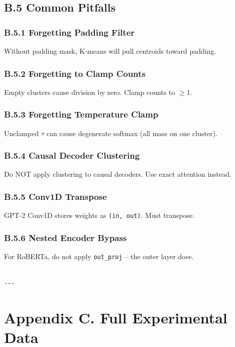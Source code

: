 \subsection{B.5 Common Pitfalls}

\subsubsection{B.5.1 Forgetting Padding Filter}

Without padding mask, K-means will pull centroids toward padding.

\subsubsection{B.5.2 Forgetting to Clamp Counts}

Empty clusters cause division by zero. Clamp counts to $\ge$1.

\subsubsection{B.5.3 Forgetting Temperature Clamp}

Unclamped $\tau$ can cause degenerate softmax (all mass on one cluster).

\subsubsection{B.5.4 Causal Decoder Clustering}

Do NOT apply clustering to causal decoders. Use exact attention instead.

\subsubsection{B.5.5 Conv1D Transpose}

GPT-2 Conv1D stores weights as \texttt{(in, out)}. Must transpose.

\subsubsection{B.5.6 Nested Encoder Bypass}

For RoBERTa, do not apply \texttt{out\_proj} -- the outer layer does.
\begin{lstlisting}

---
\end{lstlisting}

\section{Appendix C. Full Experimental Data}

